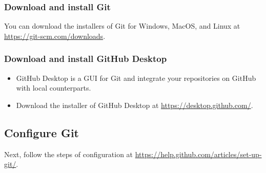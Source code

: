 \documentclass[a4paper,11pt]{article}
\begin{document}
\subsubsection*{Download and install Git}
\label{sec:orgf6fe525}

You can download the installers of Git for Windows, MacOS, and Linux at
\url{https://git-scm.com/downloads}.

\subsubsection*{Download and install GitHub Desktop}
\label{sec:org6fd8b6a}

\begin{itemize}
\item GitHub Desktop is a GUI for Git and integrate your repositories on
GitHub with local counterparts.
\item Download the installer of GitHub Desktop at
\url{https://desktop.github.com/}.
\end{itemize}

\subsection{Configure Git}
\label{sec:org46d8df8}

Next, follow the steps of configuration at
\url{https://help.github.com/articles/set-up-git/}.
\end{document}
